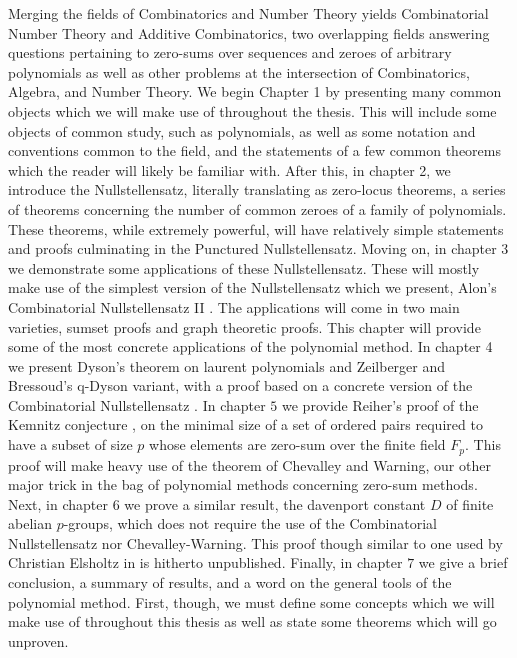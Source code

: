 Merging the fields of Combinatorics and Number Theory yields Combinatorial Number Theory and Additive Combinatorics, two overlapping fields answering questions pertaining to zero-sums over sequences and zeroes of arbitrary polynomials as well as other problems at the intersection of Combinatorics, Algebra, and Number Theory. We begin Chapter 1 by presenting many common objects which we will make use of throughout the thesis. This will include some objects of common study, such as polynomials, as well as some notation and conventions common to the field, and the statements of a few common theorems which the reader will likely be familiar with. After this, in chapter 2, we introduce the Nullstellensatz, literally translating as zero-locus theorems, a series of theorems concerning the number of common zeroes of a family of polynomials. These theorems, while extremely powerful, will have relatively simple statements and proofs culminating in the Punctured Nullstellensatz.
Moving on, in chapter 3 we demonstrate some applications of these Nullstellensatz. These will mostly make use of the simplest version of the Nullstellensatz which we present, Alon's Combinatorial Nullstellensatz II \cite{alon_1999}. The applications will come in two main varieties, sumset proofs and graph theoretic proofs. This chapter will provide some of the most concrete applications of the polynomial method. In chapter 4 we present Dyson's theorem \cite{dyson_1963} on laurent polynomials and Zeilberger and Bressoud's q-Dyson variant, with a proof based on a concrete version of the Combinatorial Nullstellensatz \cite{qdyson_2014}. In chapter \(5\) we provide Reiher's proof of the Kemnitz conjecture \cite{reiher_2007}, on the minimal size of a set of ordered pairs required to have a subset of size \(p\) whose elements are zero-sum over the finite field \(F_{p}\). This proof will make heavy use of the theorem of Chevalley and Warning, our other major trick in the bag of polynomial methods concerning zero-sum methods. Next, in chapter \(6\) we prove a similar result, the davenport constant \(D\) of finite abelian \(p\)-groups, which does not require the use of the Combinatorial Nullstellensatz nor Chevalley-Warning. This proof though similar to one used by Christian Elsholtz in \cite{Elsholtz_2007} is hitherto unpublished. Finally, in chapter \(7\) we give a brief conclusion, a summary of results, and a word on the general tools of the polynomial method. First, though, we must define some concepts which we will make use of throughout this thesis as well as state some theorems which will go unproven. \newpage
